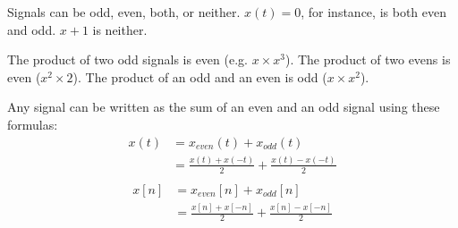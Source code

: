 Signals can be odd, even, both, or neither. $x(t) = 0$, 
for instance, is both even and odd. $x + 1$ is neither. 

The product of two odd signals is even (e.g. $x \times x^3$). 
The product of two evens is even ($x^2 \times 2$). The product of 
an odd and an even is odd ($x \times x^2$). 

Any signal can be written as the sum of an even and an odd signal 
using these formulas: 
\begin{align}
    x(t) &= x_{even}(t) + x_{odd}(t) \\
    &= \frac{x(t) + x(-t)}{2} + \frac{x(t) - x(-t)}{2} \\
\end{align}
\begin{align}
    x[n] &= x_{even}[n] + x_{odd}[n] \\
    &= \frac{x[n] + x[-n]}{2} + \frac{x[n] - x[-n]}{2} \\
\end{align}
